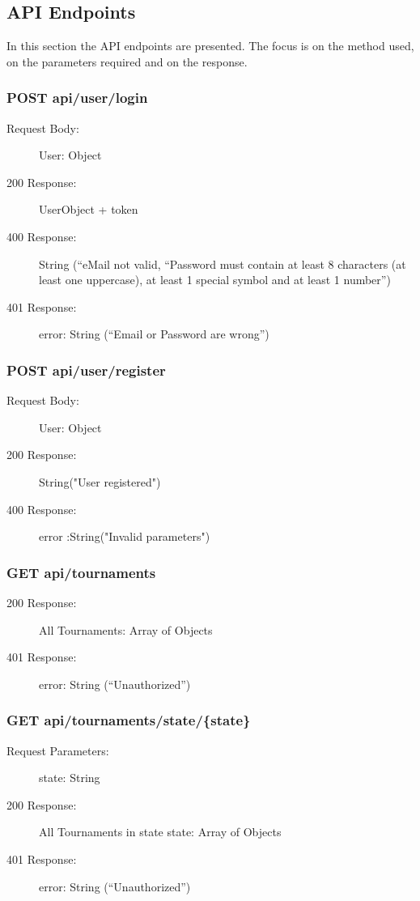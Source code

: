 \documentclass{Configuration_Files/Template}
\begin{document}
\subsection{API Endpoints}
In this section the API endpoints are presented. The focus is on the method used, on the parameters required and on the response.

\subsubsection{POST api/user/login}
\begin{description}
    \item[Request Body:] User: Object
    \item[200 Response:] UserObject + token
    \item[400 Response:] String (“eMail not valid, “Password must contain at least 8 characters (at least one uppercase), at least 1 special symbol and at least 1 number”)
    \item[401 Response:] error: String (“Email or Password are wrong”)
\end{description}

\subsubsection{POST api/user/register}
\begin{description}
    \item[Request Body:] User: Object
    \item[200 Response:] String("User registered")
    \item[400 Response:] error :String("Invalid parameters")
\end{description}

\subsubsection{GET api/tournaments}
\begin{description}
    \item[200 Response:] All Tournaments: Array of Objects
    \item[401 Response:] error: String (“Unauthorized”)
\end{description}

\subsubsection{GET api/tournaments/state/\{state\}}
\begin{description}
    \item[Request Parameters:] state: String
    \item[200 Response:] All Tournaments in state {state}: Array of Objects
    \item[401 Response:] error: String (“Unauthorized”)
\end{description}
\end{document}

